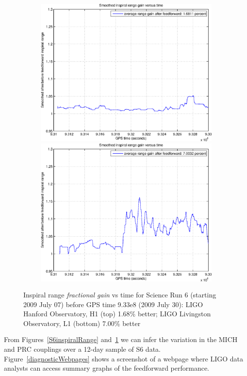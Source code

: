 \begin{figure}
\begin{center}
\includegraphics[height=75mm, width=150mm]{figure15a.eps}
\includegraphics[height=75mm, width=150mm]{figure15b.eps}
\caption{Inspiral range \textit{fractional gain} vs time for Science Run 6 (starting 2009 July 07) before GPS time 9.33e8 (2009 July 30):
LIGO Hanford Observatory, H1 (top) 1.68\% better; LIGO Livingston Observatory, L1 (bottom) 7.00\% better}
\label{S6inspiralRangeGain}
\end{center}
\end{figure}

From Figures~\ref{S6inspiralRange} and~\ref{S6inspiralRangeGain} we can infer the variation in the MICH and PRC couplings over a 12-day sample of S6 data. Figure~\ref{diagnosticWebpages} shows a screenshot of a webpage where LIGO data analysts can access summary graphs of the feedforward performance.

